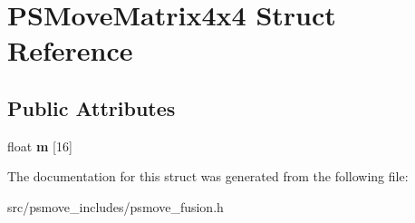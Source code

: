 \hypertarget{struct_p_s_move_matrix4x4}{\section{P\-S\-Move\-Matrix4x4 Struct Reference}
\label{struct_p_s_move_matrix4x4}
}
\subsection*{Public Attributes}
\begin{DoxyCompactItemize}
\item 
\hypertarget{struct_p_s_move_matrix4x4_aa463d466061c6e3740f003d52603596b}{float {\bfseries m} \mbox{[}16\mbox{]}}\label{struct_p_s_move_matrix4x4_aa463d466061c6e3740f003d52603596b}

\end{DoxyCompactItemize}


The documentation for this struct was generated from the following file\-:\begin{DoxyCompactItemize}
\item 
src/psmove\-\_\-includes/psmove\-\_\-fusion.\-h\end{DoxyCompactItemize}
